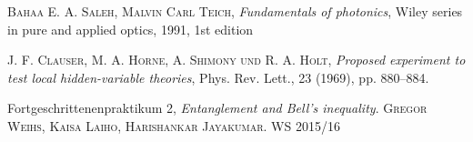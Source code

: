 \documentclass[a4paper,10pt]{article}
\begin{document}
 \begin{thebibliography}{99}

  \textsc{Bahaa E. A. Saleh, Malvin Carl Teich}, \textit{Fundamentals of photonics}, Wiley series in pure and applied optics, 1991, 1st edition

   \textsc{J. F. Clauser, M. A. Horne, A. Shimony und R. A. Holt}, \textit{Proposed experiment to
test local hidden-variable theories}, Phys. Rev. Lett., 23 (1969), pp. 880–884.

Fortgeschrittenenpraktikum 2, \textit{Entanglement and Bell’s inequality}. \textsc{Gregor Weihs, Kaisa Laiho, Harishankar Jayakumar}. WS 2015/16
\end{thebibliography}
\end{document}
